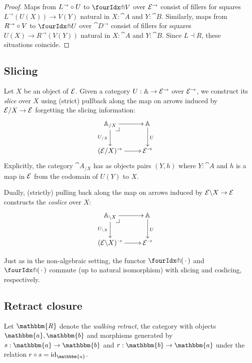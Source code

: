 \documentclass[reqno,10pt,a4paper,oneside]{amsart}
\begin{document}
\begin{proof}
Maps from $L^{\to} \mathbin{\circ} U$ to $\liftl{V}$ over $\mathcal{E}^{\to}$ consist of fillers for squares $L^{\to}(U(X)) \to V(Y)$ natural in $X : \cat{A}$ and $Y : \cat{B}$.
Similarly, maps from $R^{\to} \mathbin{\circ} V$ to $\liftr{U}$ over $\cat{D}^{\to}$ consist of fillers for squares $U(X) \to R^{\to}(V(Y))$ natural in $X : \cat{A}$ and $Y : \cat{B}$.
Since $L \dashv R$, these situations coincide.
\end{proof}

\subsection{Slicing}

Let $X$ be an object of $\mathcal{E}$.
Given a category $U : \mathbb{A} \to \mathcal{E}^{\to}$ over $\mathcal{E}^{\to}$, we construct its \emph{slice} over $X$ using (strict) pullback along the map on arrows induced by $\mathcal{E}/X \to \mathcal{E}$ forgetting the slicing information:
\[
\xymatrix{
  \cat{A}_{/X}
  \ar[r]
  \ar[d]_{U_{/X}}
  \pullback{dr}
&
  \cat{A}
  \ar[d]^{U}
\\
  (\catE/X)^{\to}
  \ar[r]
&
  \catE^{\to}
}
\]
Explicitly, the category $\cat{A}_{/X}$ has as objects pairs $(Y, h)$ where $Y : \cat{A}$ and $h$ is a map in $\mathcal{E}$ from the codomain of $U(Y)$ to $X$.

Dually, (strictly) pulling back along the map on arrows induced by $\mathcal{E} \backslash X \to \mathcal{E}$ constructs the \emph{coslice} over $X$:
\[
\xymatrix{
  \cat{A}_{\backslash X}
  \ar[r]
  \ar[d]_{U_{\backslash X}}
  \pullback{dr}
&
  \cat{A}
  \ar[d]^{U}
\\
  (\catE \backslash X)^{\to}
  \ar[r]
&
  \catE^{\to}
}
\]

\begin{remark}
\label{pitchfork-slicing}
Just as in the non-algebraic setting, the functor $\liftr{\brarghole}$ and $\liftl{\brarghole}$ commute (up to natural isomorphism) with slicing and coslicing, respectively.
\end{remark}

\subsection{Retract closure}

\newcommand{\ret}{\mathbbm{R}}
\newcommand{\retA}{\mathbbm{a}}
\newcommand{\retB}{\mathbbm{b}}

Let $\ret$ denote the \emph{walking retract}, \ie the category with objects $\retA, \retB$ and morphisms generated by $s : \retA \to \retB$ and $r : \retB \to \retA$ under the relation $r \cc s = \id_{\retA}$.
\end{document}
